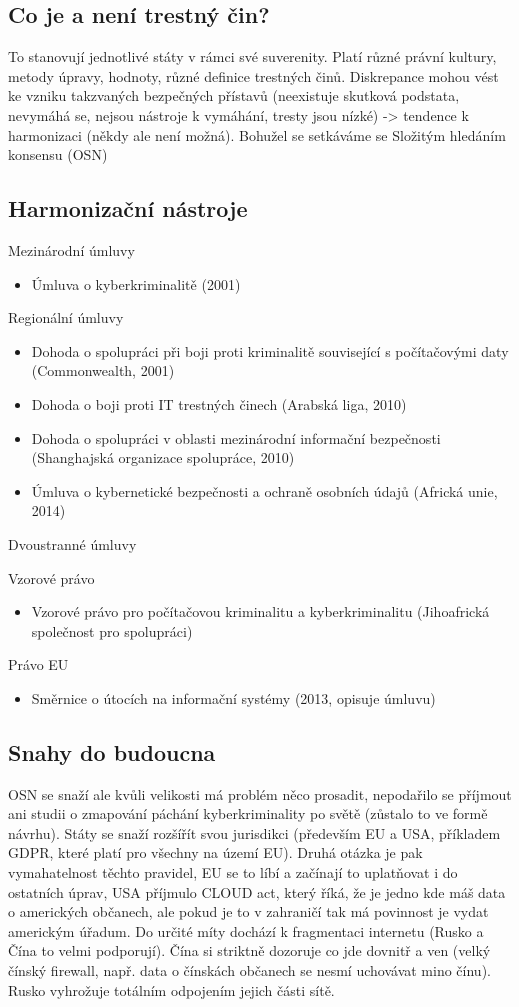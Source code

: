 \subsection{Co je a není trestný čin?}
To stanovují jednotlivé státy v rámci své suverenity. Platí různé právní kultury, metody úpravy, hodnoty, různé definice trestných činů. Diskrepance mohou vést ke vzniku takzvaných bezpečných přístavů (neexistuje skutková podstata, nevymáhá se, nejsou nástroje k vymáhání, tresty jsou nízké) -> tendence k harmonizaci (někdy ale není možná). Bohužel se setkáváme se Složitým hledáním konsensu (OSN)

\subsection{Harmonizační nástroje}
Mezinárodní úmluvy
\begin{itemize}
    \item Úmluva o kyberkriminalitě (2001)
\end{itemize}
Regionální úmluvy
\begin{itemize}
    \item Dohoda o spolupráci při boji proti kriminalitě související s počítačovými daty (Commonwealth, 2001)
    \item Dohoda o boji proti IT trestných činech (Arabská liga, 2010)
    \item Dohoda o spolupráci v oblasti mezinárodní informační bezpečnosti (Shanghajská organizace spolupráce, 2010)
    \item Úmluva o kybernetické bezpečnosti a ochraně osobních údajů (Africká unie, 2014)
\end{itemize}
Dvoustranné úmluvy

Vzorové právo
\begin{itemize}
    \item Vzorové právo pro počítačovou kriminalitu a kyberkriminalitu (Jihoafrická společnost pro spolupráci)
\end{itemize}
Právo EU
\begin{itemize}
    \item Směrnice o útocích na informační systémy (2013, opisuje úmluvu)
\end{itemize}


\subsection{Snahy do budoucna}
OSN se snaží ale kvůli velikosti má problém něco prosadit, nepodařilo se příjmout ani studii o zmapování páchání
kyberkriminality po světě (zůstalo to ve formě návrhu). Státy se snaží rozšířít svou jurisdikci (především EU a USA, příkladem GDPR, které platí pro všechny na území EU). Druhá otázka je pak vymahatelnost těchto pravidel, EU se to líbí a začínají to uplatňovat i do ostatních úprav, USA
příjmulo CLOUD act, který říká, že je jedno kde máš data o amerických občanech, ale pokud je to v zahraničí tak má povinnost je vydat americkým úřadum. Do určité míty dochází k fragmentaci internetu (Rusko a Čína to velmi podporují). Čína si striktně dozoruje co jde dovnitř a ven (velký čínský firewall, např. data o čínskách občanech se nesmí uchovávat mino čínu). Rusko vyhrožuje totálním odpojením jejich části sítě.

